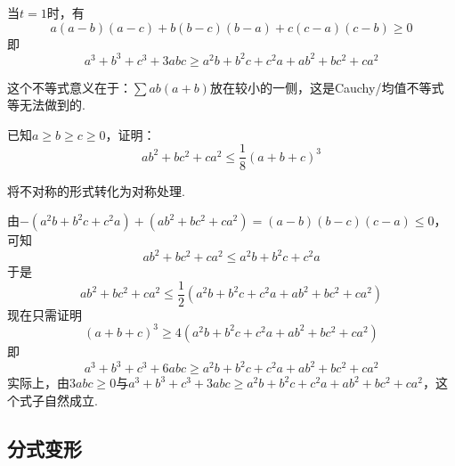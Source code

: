 \documentclass[lang=cn, zihao=4.5]{elegantbook}
\begin{document}
\begin{corollary}
	当$t=1$时，有$$a(a-b)(a-c) + b(b-c)(b-a) + c(c-a)(c-b) \geq 0$$
	即$$a^3+b^3+c^3+3abc \geq a^2b + b^2c + c^2a + ab^2 + bc^2 + ca^2$$
\end{corollary}
\begin{remark}
	这个不等式意义在于：$\sum ab(a+b)$放在较小的一侧，这是Cauchy/均值不等式等无法做到的.
\end{remark}

\begin{example} %
	已知$a \geq b \geq c \geq 0$，证明：$$ab^2+bc^2+ca^2 \leq \frac{1}{8} (a+b+c)^3$$
\end{example}
\begin{hint}
	将不对称的形式转化为对称处理.
\end{hint}
\begin{solution}
	由$-(a^2b+b^2c+c^2a)+(ab^2+bc^2+ca^2) = (a-b)(b-c)(c-a) \leq 0$，可知$$ab^2+bc^2+ca^2 \leq a^2b+b^2c+c^2a$$
	于是$$ab^2+bc^2+ca^2 \leq \frac{1}{2} (a^2b+b^2c+c^2a+ab^2+bc^2+ca^2)$$
	现在只需证明$$(a+b+c)^3 \geq 4(a^2b+b^2c+c^2a+ab^2+bc^2+ca^2)$$
	即$$a^3+b^3+c^3+6abc \geq a^2b+b^2c+c^2a+ab^2+bc^2+ca^2$$
	实际上，由$3abc \geq 0$与$a^3+b^3+c^3+3abc \geq a^2b + b^2c + c^2a + ab^2 + bc^2 + ca^2$，这个式子自然成立.
\end{solution}


\subsection{分式变形}
\end{document}
